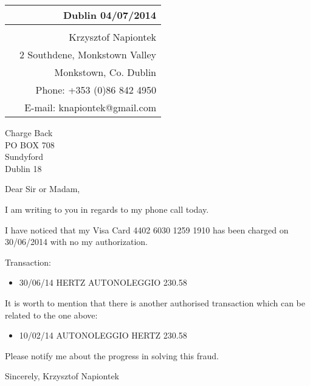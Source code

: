 \documentclass[11pt,a4paper]{letter}
\begin{document}
\begin{tabular}{p{6.5cm}r}
& Dublin 04/07/2014\\\hline
\\
& Krzysztof Napiontek\\
& 2 Southdene, Monkstown Valley\\
& Monkstown, Co. Dublin\\
& Phone: +353 (0)86 842 4950\\
& E-mail: knapiontek@gmail.com
\end{tabular}

Charge Back\\
PO BOX 708\\
Sundyford\\
Dublin 18

\bigskip

Dear Sir or Madam,

I am writing to you in regards to my phone call today.

I have noticed that my Visa Card 4402 6030 1259 1910 has been charged on 30/06/2014 with no my authorization.

Transaction:
\begin{itemize}
\item 30/06/14 HERTZ AUTONOLEGGIO 230.58
\end{itemize}

It is worth to mention that there is another authorised transaction which can be related to the one above:
\begin{itemize}
\item 10/02/14 AUTONOLEGGIO HERTZ 230.58
\end{itemize}

Please notify me about the progress in solving this fraud.

\hspace*{\longindentation}
\parbox{\indentedwidth}
{
	\raggedright Sincerely,
	\vskip 0.65in
	Krzysztof Napiontek
}
\end{document}
